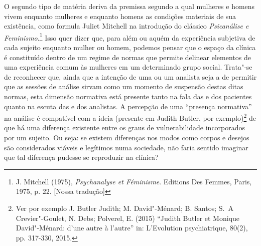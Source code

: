 O segundo tipo de matéria deriva da premissa segundo a qual mulheres e
homens vivem enquanto mulheres e enquanto homens as condições materiais
de sua existência, como formula Juliet Mitchell na introdução do
clássico \emph{Psicanálise e Feminismo}.\footnote{J. Mitchell (1975),
  \emph{Psychanalyse et Féminisme}. Editions Des Femmes, Paris, 1975, p.
  22. {[}Nossa tradução{]}} Isso quer dizer que, para além ou aquém da
experiência subjetiva de cada sujeito enquanto mulher ou homem, podemos
pensar que o espaço da clínica é constituído dentro de um regime de
normas que permite delinear elementos de uma experiência comum às
mulheres em um determinado grupo social. Trata"-se de reconhecer que,
ainda que a intenção de uma ou um analista seja a de permitir que as
sessões de análise sirvam como um momento de suspensão destas ditas
normas, esta dimensão normativa está presente tanto na fala das e dos
pacientes quanto na escuta das e dos analistas. A percepção de uma
``presença normativa'' na análise é compatível com a ideia (presente em
Judith Butler, por exemplo)\footnote{Ver por exemplo J. Butler Judith; M.
  David"-Ménard; B. Santos; S.~A Crevier"-Goulet, N. Debs; Polverel, E.
  (2015) ``Judith Butler et Monique David"-Ménard: d'une autre à
  l'autre'' in: L'Evolution psychiatrique, 80(2), pp. 317-330, 2015.} de
que há uma diferença existente entre os graus de vulnerabilidade
incorporados por um sujeito. Ou seja: se existem diferenças nos modos
como corpos e desejos são considerados viáveis e legítimos numa
sociedade, não faria sentido imaginar que tal diferença pudesse se
reproduzir na clínica?

